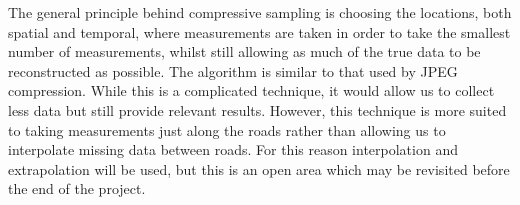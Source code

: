 The general principle behind compressive sampling is choosing the locations, both spatial and temporal, where measurements are taken in order to take the smallest number of measurements, whilst still allowing as much of the true data to be reconstructed as possible. The algorithm is similar to that used by JPEG compression. While this is a complicated technique, it would allow us to collect less data but still provide relevant results. However, this technique is more suited to taking measurements just along the roads rather than allowing us to interpolate missing data between roads. For this reason interpolation and extrapolation will be used, but this is an open area which may be revisited before the end of the project.




